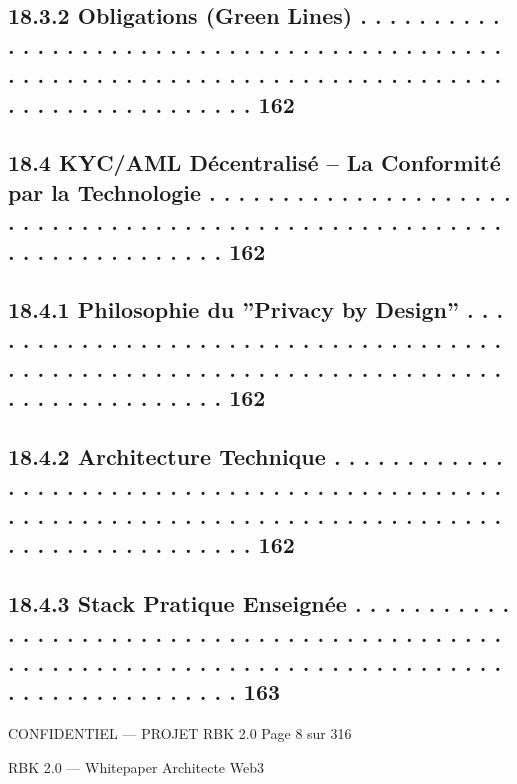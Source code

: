 \documentclass[12pt,landscape,a4paper]{article}
\newenvironment{confidential}
{\begin{tcolorbox}[
    colback=rbkred!5!white,
    colframe=rbkred!75!black,
    title=CONFIDENTIEL,
    fonttitle=\bfseries\color{white},
    coltitle=rbkred!75!black,
    breakable,
    enhanced,
    frame hidden,
    borderline west={2pt}{0pt}{rbkred!75!black}
]}
{\end{tcolorbox}}
\begin{document}
\subsection{18.3.2            Obligations (Green Lines) . . . . . . . . . . . . . . . . . . . . . . . . . . . . . . . . . . . . . . . . . . . . . . . . . . . . . . . . . . . . . . . . . . . . . . . . . . . . . . . . . . . . . . . . . . . . . . . 162}
\subsection{18.4    KYC/AML Décentralisé – La Conformité par la Technologie . . . . . . . . . . . . . . . . . . . . . . . . . . . . . . . . . . . . . . . . . . . . . . . . . . . . . . . . . . . . . . . . . . . . . . 162}
\subsection{18.4.1            Philosophie du ”Privacy by Design” . . . . . . . . . . . . . . . . . . . . . . . . . . . . . . . . . . . . . . . . . . . . . . . . . . . . . . . . . . . . . . . . . . . . . . . . . . . . . . . . . . . . . . 162}
\subsection{18.4.2            Architecture Technique . . . . . . . . . . . . . . . . . . . . . . . . . . . . . . . . . . . . . . . . . . . . . . . . . . . . . . . . . . . . . . . . . . . . . . . . . . . . . . . . . . . . . . . . . . . . . . . . . 162}
\subsection{18.4.3            Stack Pratique Enseignée . . . . . . . . . . . . . . . . . . . . . . . . . . . . . . . . . . . . . . . . . . . . . . . . . . . . . . . . . . . . . . . . . . . . . . . . . . . . . . . . . . . . . . . . . . . . . . . 163}
\vspace{0.5em}
\vspace{0.5em}
\vspace{0.5em}
\begin{confidential}CONFIDENTIEL — PROJET RBK 2.0                                                                           Page 8 sur 316\end{confidential}
RBK 2.0 — Whitepaper Architecte Web3\\
\vspace{0.5em}
\vspace{0.5em}
\end{document}
